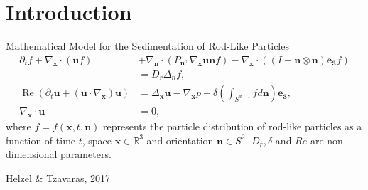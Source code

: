 \section{Introduction}

\begin{frame}{Mathematical Model for the Sedimentation of Rod-Like Particles}
	\scriptsize
{}
\begin{align*}
\partial_t f+ \nabla_{\boldsymbol{x}} \cdot(\boldsymbol{u} f) & +\nabla_{\boldsymbol{n}} \cdot\left(P_{\boldsymbol{n}^{\perp}} \nabla_{\boldsymbol{x}} \boldsymbol{u} \boldsymbol{n} f\right)- \nabla_{\boldsymbol{x}} \cdot\left((I+\boldsymbol{n} \otimes \boldsymbol{n}) \boldsymbol{e_3} f\right) \\
	& =D_r \Delta_n f, \\
	\operatorname{Re}\left(\partial_t \boldsymbol{u}+\left(\boldsymbol{u} \cdot \nabla_{\boldsymbol{x}}\right) \boldsymbol{u}\right) & =\Delta_{\boldsymbol{x}} \boldsymbol{u}-\nabla_{\boldsymbol{x}} p-\delta \left(\int_{S^{d-1}} f d \boldsymbol{n} \right) \boldsymbol{e_3}, \\
	\nabla_{\boldsymbol{x}} \cdot \boldsymbol{u} & =0,
\end{align*}
where $f = f(\boldsymbol{x}, t, \boldsymbol{n})$ represents the particle distribution of rod-like particles as a function of time $t$, space $\boldsymbol{x} \in \mathbb{R}^3$ and orientation $\boldsymbol{n} \in  S^2$. 
$D_r, \delta$ and $Re$ are non-dimensional parameters.
\begin{beamercolorbox}[sep=1em,wd=\linewidth,right]{}
	\tiny{Helzel $\&$ Tzavaras, 2017}
\end{beamercolorbox}
\end{frame}

